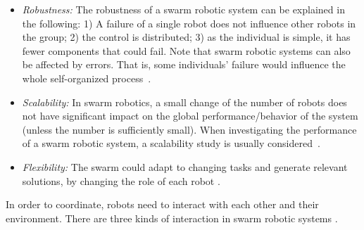 \begin{itemize}

\item \textit{Robustness:}  The robustness of a swarm robotic system can be explained in the following: 1) A failure of a single robot does not influence other robots in the group; 2) the control is distributed; 3) as the individual is simple, it has fewer components that could fail. Note that swarm robotic systems can also be affected by errors. That is, some individuals' failure would influence the whole self-organized process~\cite{Bjerknes2013}.

\item \textit{Scalability:} In swarm robotics, a small change of the number of robots does not have significant impact on the global performance/behavior of the system (unless the number is sufficiently small). When investigating the performance of a swarm robotic system, a scalability study is usually considered~\cite{Jianing:TRO:2015, Melvin_DARS2014}.

\item \textit{Flexibility:} The swarm could adapt to changing tasks and generate relevant solutions, by changing the role of each robot \cite{Sahin:LNCS:2005}. 
\end{itemize}

In order to coordinate, robots need to interact with each other and their environment. There are three kinds of interaction in swarm robotic systems \cite{Rodeirch2015}. 

